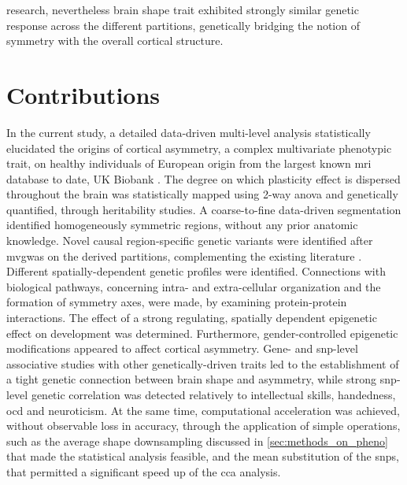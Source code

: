 research, nevertheless brain shape trait exhibited strongly similar genetic response \cite{Naqvi2021} across the different partitions, genetically bridging the notion of symmetry with the overall cortical structure. 

\section{Contributions}
In the current study, a detailed  data-driven multi-level analysis statistically elucidated the origins of cortical asymmetry, a complex multivariate phenotypic trait, on healthy individuals of European origin from the largest known \ac{mri} database to date, UK Biobank \cite{Littlejohns2020}. The degree on which plasticity effect is dispersed throughout the brain was statistically mapped using 2-way \ac{anova} and genetically quantified, through heritability studies. A coarse-to-fine data-driven segmentation identified homogeneously symmetric regions, without any prior anatomic knowledge.  Novel causal region-specific genetic variants were identified after \ac{mvgwas} on the derived partitions, complementing the existing literature \cite{Sha2021}. Different spatially-dependent genetic profiles were identified. Connections with biological pathways, concerning intra- and extra-cellular organization and the formation of symmetry axes, were made, by examining protein-protein interactions. The effect of a strong regulating, spatially dependent epigenetic effect on development was determined. Furthermore, gender-controlled epigenetic modifications appeared to affect cortical asymmetry. Gene- and \ac{snp}-level associative studies  with other genetically-driven traits led to the establishment of a tight genetic connection between  brain shape and asymmetry, while strong \ac{snp}-level genetic correlation was detected relatively to intellectual skills, handedness, \ac{ocd} and neuroticism. At the same time, computational acceleration was achieved, without observable loss in accuracy, through the application of simple operations, such as the average shape downsampling discussed in \autoref{sec:methods_on_pheno} that made the statistical analysis feasible, and the mean substitution of the \acp{snp}, that permitted a significant speed up of the \ac{cca} analysis.

